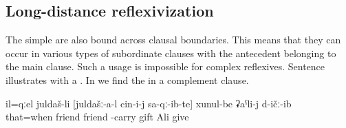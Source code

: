 
\subsection{Long-distance reflexivization}
\label{ssec:Long-distance reflexivization}

The simple  are also bound across clausal boundaries. This means that they can occur in various types of subordinate clauses with the antecedent belonging to the main clause. Such a usage is impossible for complex reflexives. Sentence  illustrates  with a . In  we find the  in a complement clause.
%
\begin{exe}
	\ex	\label{ex:At that the friend gave to Ali the gifts@5}
	\gll	il=qːel	juldaš-li	[juldašː-a-l	cin-i-j	sa-qː-ib-te]		xunul-be	ʡaˁli-j	d-ičː-ib\\
		that=when	friend	friend		-carry 		gift	Ali	give\\
	\glt	{}	
\end{exe}

